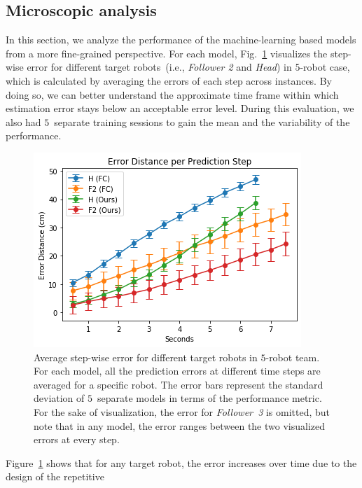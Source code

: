 \documentclass[letterpaper, 10 pt, conference]{ieeeconf}  %
\begin{document}
	\subsection{Microscopic analysis}
	\label{sec:microscopic_analysis}

    In this section, we analyze the performance of the machine-learning
    based models from a more fine-grained perspective. For each model,
    Fig.~\ref{fig:micro_eval} visualizes the step-wise error for
    different target robots~(i.e., \emph{Follower 2} and \emph{Head}) in
    $5$-robot case, which is calculated by averaging the errors of each
    step across instances. By doing so, we can better understand the
    approximate time frame within which estimation error stays below an
    acceptable error level. During this evaluation, we also had
    $5$~separate training sessions to gain the mean and the variability
    of the performance.
	\begin{figure}[t]
		\centering
		\includegraphics[width=1.\columnwidth]{fig_micro_eval}
		\caption{Average step-wise error for different target robots in $5$-robot team.
			For each model, all the prediction errors at different time steps are averaged
			for a specific robot. The error bars represent the standard deviation of
			$5$~separate models in terms of the performance metric. For the sake of
			visualization, the error for \emph{Follower~3} is omitted, but note that
			in any model, the error ranges between the two visualized errors at every step.
		}
		\label{fig:micro_eval}
	\end{figure}
    Figure~\ref{fig:micro_eval} shows that for any target robot, the
    error increases over time due to the design of the repetitive
\end{document}
